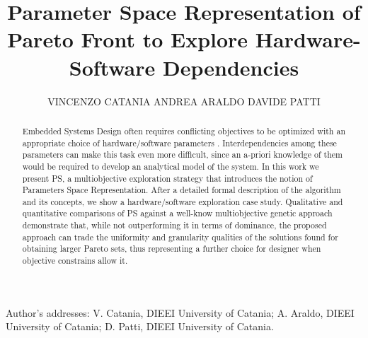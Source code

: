 \documentclass[prodmode,acmtecs]{acmsmall}
\begin{document}


\title{Parameter Space Representation of Pareto Front to
Explore Hardware-Software Dependencies}
\author{VINCENZO CATANIA
ANDREA ARALDO
DAVIDE PATTI
}

\begin{abstract}
Embedded Systems Design often requires conflicting objectives to be
optimized with an appropriate choice of hardware/software parameters .
Interdependencies among these parameters can make this task even more
difficult, since an a-priori knowledge of them would  be required to
develop an analytical model of the system. In this work we present PS,
a multiobjective exploration strategy that introduces the notion of
Parameters Space Representation. After a detailed formal description
of the algorithm and its concepts, we show a hardware/software
exploration case study. Qualitative and quantitative comparisons of PS
against a well-know multiobjective genetic approach demonstrate that,
while not outperforming it in terms of dominance, the proposed
approach can trade the uniformity and granularity qualities of the
solutions found for obtaining larger Pareto sets, thus representing a
further choice for designer when objective constrains allow it.
\end{abstract}





\begin{bottomstuff}
Author's addresses: V. Catania, DIEEI University of Catania;
A. Araldo, DIEEI University of Catania;
D. Patti, DIEEI University of Catania.
\end{bottomstuff}

\maketitle




\end{document}
